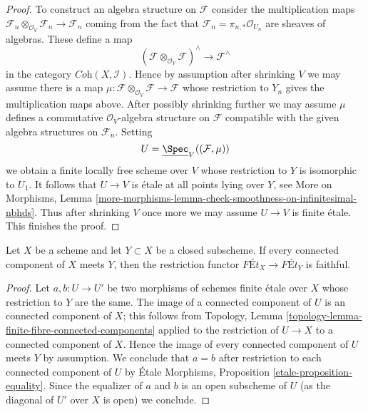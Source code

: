\begin{proof}
\medskip\noindent
To construct an algebra structure on $\mathcal{F}$ consider the multiplication
maps
$\mathcal{F}_n \otimes_{\mathcal{O}_V} \mathcal{F}_n \to \mathcal{F}_n$
coming from the fact that $\mathcal{F}_n = \pi_{n, *}\mathcal{O}_{U_n}$
are sheaves of algebras. These define a map
$$
(\mathcal{F}\otimes_{\mathcal{O}_V} \mathcal{F})^\wedge
\longrightarrow
\mathcal{F}^\wedge
$$
in the category $\textit{Coh}(X, \mathcal{I})$. Hence by assumption
after shrinking $V$ we may assume there is a map
$\mu : \mathcal{F}\otimes_{\mathcal{O}_V} \mathcal{F} \to \mathcal{F}$
whose restriction to $Y_n$ gives the multiplication maps above.
After possibly shrinking further we may assume $\mu$
defines a commutative $\mathcal{O}_V$-algebra
structure on $\mathcal{F}$ compatible with the given algebra
structures on $\mathcal{F}_n$.
Setting
$$
U = \underline{\Spec}_V((\mathcal{F}, \mu))
$$
we obtain a finite locally free scheme over $V$ whose restriction
to $Y$ is isomorphic to $U_1$. It follows that $U \to V$
is \'etale at all points lying over $Y$, see
More on Morphisms, Lemma
\ref{more-morphisms-lemma-check-smoothness-on-infinitesimal-nbhds}.
Thus after shrinking $V$ once more we may assume $U \to V$ is
finite \'etale. This finishes the proof.
\end{proof}

\begin{lemma}
\label{lemma-restriction-faithful}
Let $X$ be a scheme and let $Y \subset X$ be a closed subscheme.
If every connected component of $X$ meets $Y$, then
the restriction functor $\textit{F\'Et}_X \to \textit{F\'Et}_Y$
is faithful.
\end{lemma}

\begin{proof}
Let $a, b : U \to U'$ be two morphisms of schemes finite \'etale over $X$
whose restriction to $Y$ are the same. The image of a connected component
of $U$ is an connected component of $X$; this follows from
Topology, Lemma \ref{topology-lemma-finite-fibre-connected-components}
applied to the restriction of $U \to X$ to a connected component of $X$.
Hence the image of every connected component of $U$ meets $Y$
by assumption. We conclude that $a = b$ after restriction to each
connected component of $U$ by \'Etale Morphisms, Proposition
\ref{etale-proposition-equality}. Since the equalizer of $a$ and $b$
is an open subscheme of $U$ (as the diagonal of $U'$ over $X$ is open)
we conclude.
\end{proof}

